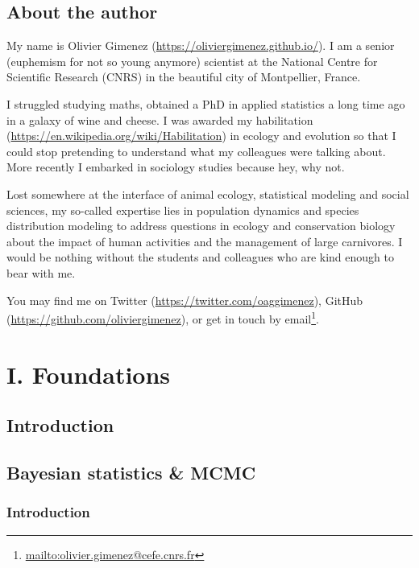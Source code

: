 \documentclass[
  12pt,
]{krantz}
\renewcommand{\href}[2]{#2\footnote{\url{#1}}}
\begin{document}
\hypertarget{about-the-author}{%
\chapter*{About the author}\label{about-the-author}}


My name is Olivier Gimenez (\url{https://oliviergimenez.github.io/}). I am a senior (euphemism for not so young anymore) scientist at the National Centre for Scientific Research (CNRS) in the beautiful city of Montpellier, France.

I struggled studying maths, obtained a PhD in applied statistics a long time ago in a galaxy of wine and cheese. I was awarded my habilitation (\url{https://en.wikipedia.org/wiki/Habilitation}) in ecology and evolution so that I could stop pretending to understand what my colleagues were talking about. More recently I embarked in sociology studies because hey, why not.

Lost somewhere at the interface of animal ecology, statistical modeling and social sciences, my so-called expertise lies in population dynamics and species distribution modeling to address questions in ecology and conservation biology about the impact of human activities and the management of large carnivores. I would be nothing without the students and colleagues who are kind enough to bear with me.

You may find me on Twitter (\url{https://twitter.com/oaggimenez}), GitHub (\url{https://github.com/oliviergimenez}), or get in touch \href{mailto:olivier.gimenez@cefe.cnrs.fr}{by email}.

\mainmatter

\hypertarget{part-i.-foundations}{%
\part{I. Foundations}\label{part-i.-foundations}}

\hypertarget{introduction}{%
\chapter*{Introduction}\label{introduction}}


\hypertarget{crashcourse}{%
\chapter{Bayesian statistics \& MCMC}\label{crashcourse}}

\hypertarget{introduction-1}{%
\section{Introduction}\label{introduction-1}}
\end{document}
